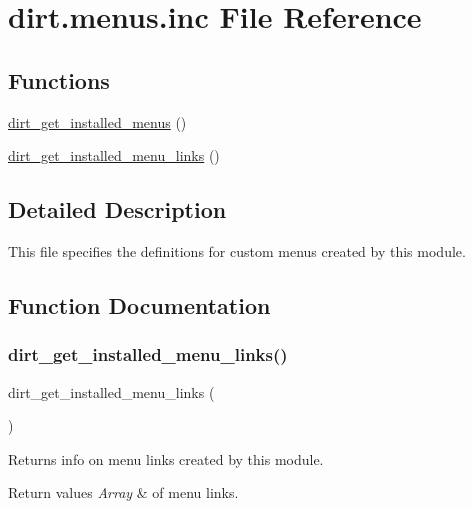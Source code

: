 \hypertarget{dirt_8menus_8inc}{}\section{dirt.\+menus.\+inc File Reference}
\label{dirt_8menus_8inc}
\subsection*{Functions}
\begin{DoxyCompactItemize}
\item 
\mbox{\hyperlink{dirt_8menus_8inc_a38700a5a607092d60357a9916937f72a}{dirt\+\_\+get\+\_\+installed\+\_\+menus}} ()
\item 
\mbox{\hyperlink{dirt_8menus_8inc_a06d853aeb9585e8e7a2bfaf83f90741d}{dirt\+\_\+get\+\_\+installed\+\_\+menu\+\_\+links}} ()
\end{DoxyCompactItemize}


\subsection{Detailed Description}
This file specifies the definitions for custom menus created by this module. 

\subsection{Function Documentation}
\mbox{\label{dirt_8menus_8inc_a06d853aeb9585e8e7a2bfaf83f90741d}} 
\subsubsection{\texorpdfstring{dirt\+\_\+get\+\_\+installed\+\_\+menu\+\_\+links()}{dirt\_get\_installed\_menu\_links()}}
{\footnotesize\ttfamily dirt\+\_\+get\+\_\+installed\+\_\+menu\+\_\+links (\begin{DoxyParamCaption}{ }\end{DoxyParamCaption})}

Returns info on menu links created by this module.


\begin{DoxyRetVals}{Return values}
{\em Array} & of menu links. \\
\hline
\end{DoxyRetVals}
\mbox{\label{dirt_8menus_8inc_a38700a5a607092d60357a9916937f72a}} 
